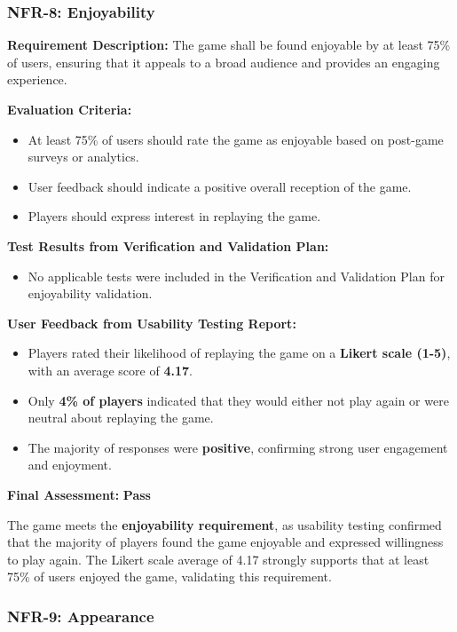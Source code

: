\documentclass[12pt, titlepage]{article}
\begin{document}
\subsubsection{NFR-8: Enjoyability}

\textbf{Requirement Description:}  
The game shall be found enjoyable by at least 75\% of users, ensuring that it appeals to a broad audience and provides an engaging experience.

\textbf{Evaluation Criteria:}  
\begin{itemize}
    \item At least 75\% of users should rate the game as enjoyable based on post-game surveys or analytics.
    \item User feedback should indicate a positive overall reception of the game.
    \item Players should express interest in replaying the game.
\end{itemize}

\textbf{Test Results from Verification and Validation Plan:}  
\begin{itemize}
    \item No applicable tests were included in the Verification and Validation Plan for enjoyability validation.
\end{itemize}

\textbf{User Feedback from Usability Testing Report:}  
\begin{itemize}
    \item Players rated their likelihood of replaying the game on a \textbf{Likert scale (1-5)}, with an average score of \textbf{4.17}.
    \item Only \textbf{4\% of players} indicated that they would either not play again or were neutral about replaying the game.
    \item The majority of responses were \textbf{positive}, confirming strong user engagement and enjoyment.
\end{itemize}

\textbf{Final Assessment:} \textbf{Pass} 
 
The game meets the \textbf{enjoyability requirement}, as usability testing confirmed that the majority of players found the game enjoyable and expressed willingness to play again. The Likert scale average of 4.17 strongly supports that at least 75\% of users enjoyed the game, validating this requirement.

\subsubsection{NFR-9: Appearance}
\end{document}
